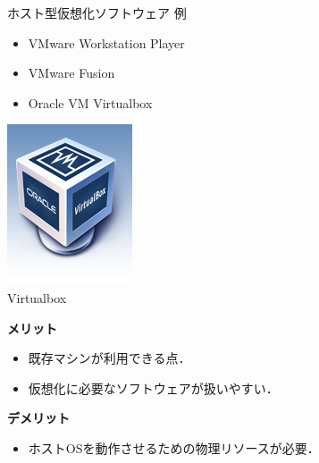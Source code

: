 \begin{frame}[t]{\ftitle}
    \begin{exampleblock}{ホスト型仮想化ソフトウェア 例}
        \begin{minipage}[b]{.8\textwidth}
            \begin{itemize}
                \setlength{\itemsep}{1em}
                \item VMware Workstation Player
                \item VMware Fusion
                \item Oracle VM Virtualbox
            \end{itemize}
        \end{minipage}
        \begin{minipage}[b]{.15\textwidth}
            \centering
            \includegraphics[keepaspectratio,width=.8\textwidth]{virtualbox_logo.png}\\
            {\tiny Virtualbox\cite{VMBox}}
        \end{minipage}
    \end{exampleblock}
    \begin{minipage}[t]{.48\textwidth}
        \textbf{\cmark メリット}
        \begin{itemize}
            \item 既存マシンが利用できる点．
            \item 仮想化に必要なソフトウェアが扱いやすい．
        \end{itemize}
    \end{minipage}
    \begin{minipage}[t]{.48\textwidth}
        \textbf{\xmark デメリット}
        \begin{itemize}
            \item ホストOSを動作させるための物理リソースが必要．
        \end{itemize}
    \end{minipage}\\
    \hfill\cite{itmanage}
\end{frame}
